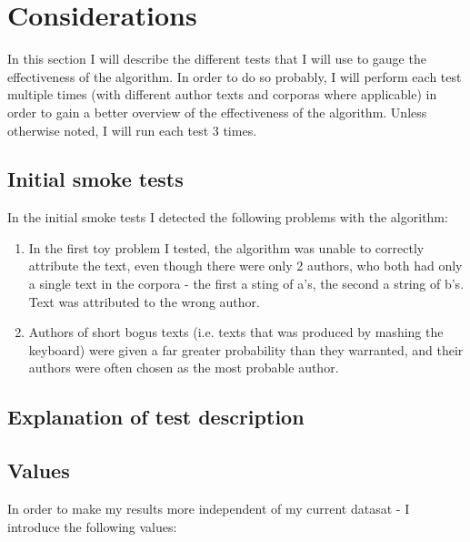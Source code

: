 \section{Considerations}
\label{considerations}

In this section I will describe the different tests that I will use to gauge the effectiveness of the algorithm. In order to do so probably, I will perform each test multiple times (with different author texts and corporas where applicable) in order to gain a better overview of the effectiveness of the algorithm. Unless otherwise noted, I  will run each test 3 times.

\subsection{Initial smoke tests}
\label{smokeTest}
In the initial smoke tests I detected the following problems with the algorithm:
\begin{enumerate}
\item In the first toy problem I tested, the algorithm was unable to correctly attribute the text, even though there were only 2 authors, who both had only a single text in the corpora - the first a sting of a's, the second a string of b's. Text was attributed to the wrong author.

\item Authors of short bogus texts (i.e. texts that was produced by mashing the keyboard) were given a far greater probability than they warranted, and their authors were often chosen as the most probable author. 
\end{enumerate}
 

\subsection{Explanation of test description}

\subsection{Values}
In order to make my results more independent of my current datasat - I introduce the following values:

